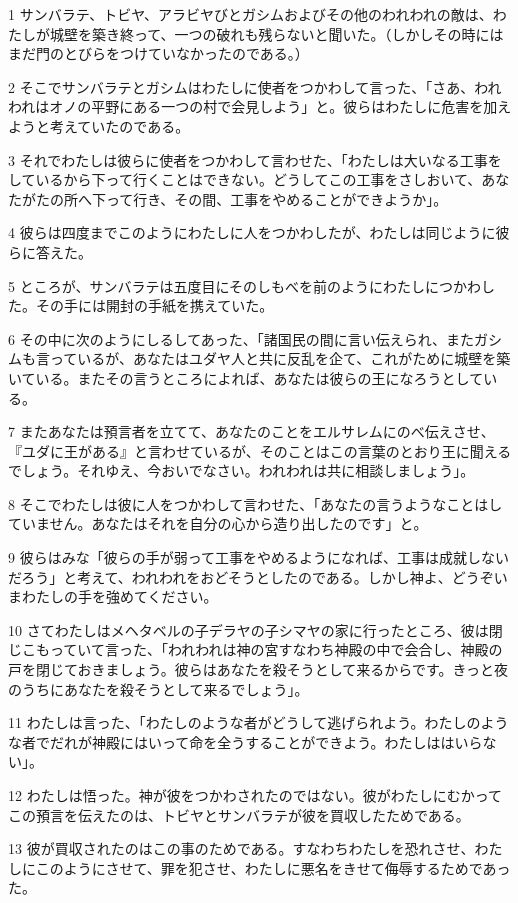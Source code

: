 \par 1 サンバラテ、トビヤ、アラビヤびとガシムおよびその他のわれわれの敵は、わたしが城壁を築き終って、一つの破れも残らないと聞いた。（しかしその時にはまだ門のとびらをつけていなかったのである。）
\par 2 そこでサンバラテとガシムはわたしに使者をつかわして言った、「さあ、われわれはオノの平野にある一つの村で会見しよう」と。彼らはわたしに危害を加えようと考えていたのである。
\par 3 それでわたしは彼らに使者をつかわして言わせた、「わたしは大いなる工事をしているから下って行くことはできない。どうしてこの工事をさしおいて、あなたがたの所へ下って行き、その間、工事をやめることができようか」。
\par 4 彼らは四度までこのようにわたしに人をつかわしたが、わたしは同じように彼らに答えた。
\par 5 ところが、サンバラテは五度目にそのしもべを前のようにわたしにつかわした。その手には開封の手紙を携えていた。
\par 6 その中に次のようにしるしてあった、「諸国民の間に言い伝えられ、またガシムも言っているが、あなたはユダヤ人と共に反乱を企て、これがために城壁を築いている。またその言うところによれば、あなたは彼らの王になろうとしている。
\par 7 またあなたは預言者を立てて、あなたのことをエルサレムにのべ伝えさせ、『ユダに王がある』と言わせているが、そのことはこの言葉のとおり王に聞えるでしょう。それゆえ、今おいでなさい。われわれは共に相談しましょう」。
\par 8 そこでわたしは彼に人をつかわして言わせた、「あなたの言うようなことはしていません。あなたはそれを自分の心から造り出したのです」と。
\par 9 彼らはみな「彼らの手が弱って工事をやめるようになれば、工事は成就しないだろう」と考えて、われわれをおどそうとしたのである。しかし神よ、どうぞいまわたしの手を強めてください。
\par 10 さてわたしはメヘタベルの子デラヤの子シマヤの家に行ったところ、彼は閉じこもっていて言った、「われわれは神の宮すなわち神殿の中で会合し、神殿の戸を閉じておきましょう。彼らはあなたを殺そうとして来るからです。きっと夜のうちにあなたを殺そうとして来るでしょう」。
\par 11 わたしは言った、「わたしのような者がどうして逃げられよう。わたしのような者でだれが神殿にはいって命を全うすることができよう。わたしははいらない」。
\par 12 わたしは悟った。神が彼をつかわされたのではない。彼がわたしにむかってこの預言を伝えたのは、トビヤとサンバラテが彼を買収したためである。
\par 13 彼が買収されたのはこの事のためである。すなわちわたしを恐れさせ、わたしにこのようにさせて、罪を犯させ、わたしに悪名をきせて侮辱するためであった。
